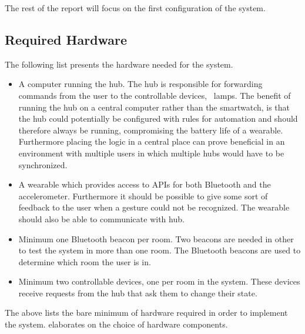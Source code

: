 The rest of the report will focus on the first configuration of the system.

\subsection{Required Hardware}
\label{sec:analysis:system-components:required-hardware}

The following list presents the hardware needed for the system.

\begin{itemize}
\item A computer running the hub. The hub is responsible for forwarding commands from the user to the controllable devices, \eg~lamps. The benefit of running the hub on a central computer rather than the smartwatch, is that the hub could potentially be configured with rules for automation and should therefore always be running, compromising the battery life of a wearable. Furthermore placing the logic in a central place can prove beneficial in an environment with multiple users in which multiple hubs would have to be synchronized.
\item A wearable which provides access to APIs for both Bluetooth and the accelerometer. Furthermore it should be possible to give some sort of feedback to the user when a gesture could not be recognized. The wearable should also be able to communicate with hub.
\item Minimum one Bluetooth beacon per room. Two beacons are needed in other to test the system in more than one room. The Bluetooth beacons are used to determine which room the user is in.
\item Minimum two controllable devices, one per room in the system. These devices receive requests from the hub that ask them to change their state.
\end{itemize}

The above lists the bare minimum of hardware required in order to implement the system.  elaborates on the choice of hardware components.



